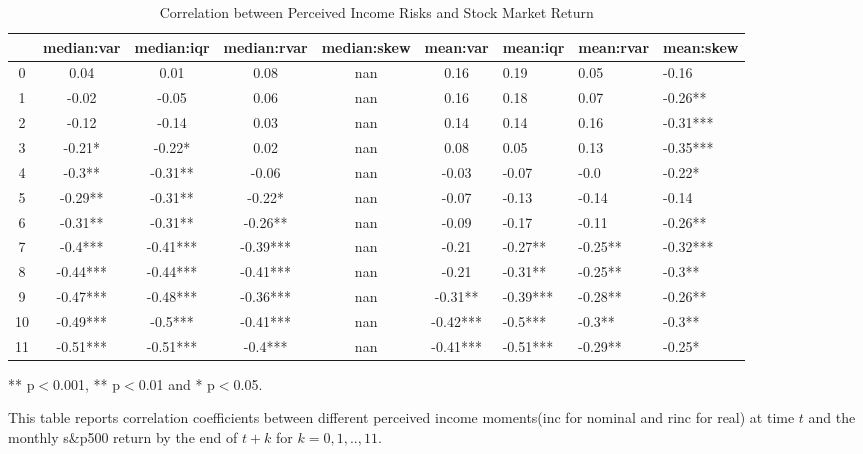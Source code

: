 
\begin{table}[ht]
\centering
\begin{adjustbox}{width={\textwidth}}
\begin{threeparttable}
\caption{Correlation between Perceived Income Risks and Stock Market Return}
\label{macro_corr}
\begin{tabular}{cccccclll}
\toprule
{} & median:var & median:iqr & median:rvar & median:skew &  mean:var &  mean:iqr & mean:rvar & mean:skew \\
\midrule
0  &       0.04 &       0.01 &        0.08 &         nan &      0.16 &      0.19 &      0.05 &     -0.16 \\
1  &      -0.02 &      -0.05 &        0.06 &         nan &      0.16 &      0.18 &      0.07 &   -0.26** \\
2  &      -0.12 &      -0.14 &        0.03 &         nan &      0.14 &      0.14 &      0.16 &  -0.31*** \\
3  &     -0.21* &     -0.22* &        0.02 &         nan &      0.08 &      0.05 &      0.13 &  -0.35*** \\
4  &     -0.3** &    -0.31** &       -0.06 &         nan &     -0.03 &     -0.07 &      -0.0 &    -0.22* \\
5  &    -0.29** &    -0.31** &      -0.22* &         nan &     -0.07 &     -0.13 &     -0.14 &     -0.14 \\
6  &    -0.31** &    -0.31** &     -0.26** &         nan &     -0.09 &     -0.17 &     -0.11 &   -0.26** \\
7  &    -0.4*** &   -0.41*** &    -0.39*** &         nan &     -0.21 &   -0.27** &   -0.25** &  -0.32*** \\
8  &   -0.44*** &   -0.44*** &    -0.41*** &         nan &     -0.21 &   -0.31** &   -0.25** &    -0.3** \\
9  &   -0.47*** &   -0.48*** &    -0.36*** &         nan &   -0.31** &  -0.39*** &   -0.28** &   -0.26** \\
10 &   -0.49*** &    -0.5*** &    -0.41*** &         nan &  -0.42*** &   -0.5*** &    -0.3** &    -0.3** \\
11 &   -0.51*** &   -0.51*** &     -0.4*** &         nan &  -0.41*** &  -0.51*** &   -0.29** &    -0.25* \\
\bottomrule
\end{tabular}
\begin{tablenotes}
\item *** p$<$0.001, ** p$<$0.01 and * p$<$0.05. 
\item This table reports correlation coefficients between different perceived income moments(inc for nominal 
and rinc for real) at time 
$t$ and the monthly s\&p500 return by the end of $t+k$ for $k=0,1,..,11$. 
\end{tablenotes}
\end{threeparttable}
\end{adjustbox}
\end{table}